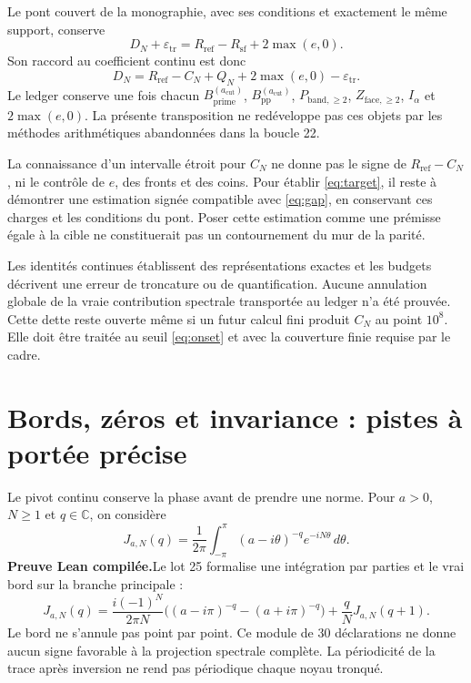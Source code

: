 \documentclass[11pt,a4paper]{article}
\theoremstyle{remark}
\newcommand{\C}{\mathbb C}
\newcommand{\paid}{\textbf{Preuve Lean compilée.}\space}
\begin{document}
Le pont couvert de la monographie, avec ses conditions et exactement
le même support, conserve
\begin{equation}\label{eq:ledger}
D_N+\varepsilon_{\mathrm{tr}}
=R_{\mathrm{ref}}-R_{\mathrm{sf}}+2\max(e,0).
\end{equation}
Son raccord au coefficient continu est donc
\begin{equation}\label{eq:gap}
D_N=R_{\mathrm{ref}}-C_N+Q_N+2\max(e,0)-\varepsilon_{\mathrm{tr}}.
\end{equation}
Le ledger conserve une fois chacun
$B_{\mathrm{prime}}^{(a_{\mathrm{cut}})}$,
$B_{\mathrm{pp}}^{(a_{\mathrm{cut}})}$,
$P_{\mathrm{band},\ge2}$, $Z_{\mathrm{face},\ge2}$, $I_\alpha$ et
$2\max(e,0)$. La présente transposition ne redéveloppe pas ces objets
par les méthodes arithmétiques abandonnées dans la boucle 22.

La connaissance d'un intervalle étroit pour $C_N$ ne donne pas le signe
de $R_{\mathrm{ref}}-C_N$, ni le contrôle de $e$, des fronts et des coins.
Pour établir \eqref{eq:target}, il reste à démontrer une estimation
signée compatible avec \eqref{eq:gap}, en conservant ces charges et les
conditions du pont. Poser cette estimation comme une prémisse égale à
la cible ne constituerait pas un contournement du mur de la parité.

Les identités continues établissent des représentations exactes et les
budgets décrivent une erreur de troncature ou de quantification. Aucune
annulation globale de la vraie contribution spectrale transportée au
ledger n'a été prouvée. Cette dette reste ouverte même si un futur
calcul fini produit $C_N$ au point $10^8$. Elle doit être traitée au
seuil \eqref{eq:onset} et avec la couverture finie requise par le cadre.

\clearpage
\section{Bords, zéros et invariance : pistes à portée précise}\label{sec:strategy}
Le pivot continu conserve la phase avant de prendre une norme. Pour
$a>0$, $N\ge1$ et $q\in\C$, on considère
\[
J_{a,N}(q)=\frac1{2\pi}\int_{-\pi}^{\pi}
(a-i\theta)^{-q}e^{-iN\theta}\,d\theta.
\]
\paid Le lot 25 formalise une intégration par parties et le vrai bord
sur la branche principale :
\begin{equation}\label{eq:bord}
J_{a,N}(q)=\frac{i(-1)^N}{2\pi N}
\bigl((a-i\pi)^{-q}-(a+i\pi)^{-q}\bigr)
+\frac qN J_{a,N}(q+1).
\end{equation}
Le bord ne s'annule pas point par point. Ce module de 30 déclarations
ne donne aucun signe favorable à la projection spectrale complète.
La périodicité de la trace après inversion ne rend pas périodique
chaque noyau tronqué.
\end{document}
